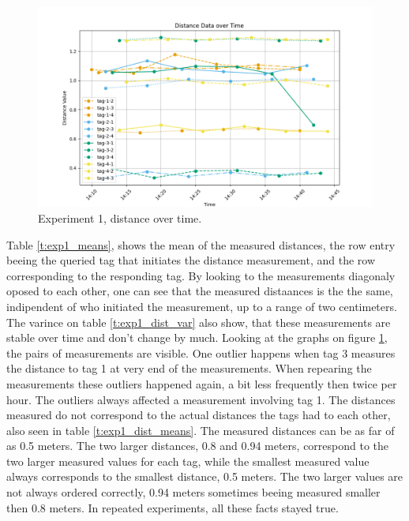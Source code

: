 \begin{figure}[ht!]
\includegraphics[width=\linewidth]{graphics/exp/exp1_dist_data_plot_0.png}
 \caption{Experiment 1, distance over time.}
\label{f:exp1_graphs_dist}
\end{figure}

Table \ref{t:exp1_means}, shows the mean of the measured distances, the row entry beeing the queried tag that initiates the distance measurement, and the row corresponding to the responding tag.
By looking to the measurements diagonaly oposed to each other, one can see that the measured distaances is the the same, indipendent of who initiated the measurement, up to a range of two centimeters.
The varince on table \ref{t:exp1_dist_var} also show, that these measurements are stable over time and don't change by much.
Looking at the graphs on figure \ref{f:exp1_graphs_dist}, the pairs of measurements are visible.
One outlier happens when tag 3 measures the distance to tag 1 at very end of the measurements.
When repearing the measurements these outliers happened again, a bit less frequently then twice per hour.
The outliers always affected a measurement involving tag 1.
The distances measured do not correspond to the actual distances the tags had to each other, also seen in table \ref{t:exp1_dist_means}.
The measured distances can be as far of as 0.5 meters.
The two larger distances, 0.8 and 0.94 meters, correspond to the two larger measured values for each tag, while the smallest measured value always corresponds to the smallest distance, 0.5 meters.
The two larger values are not always ordered correctly, 0.94 meters sometimes beeing measured smaller then 0.8 meters.
In repeated experiments, all these facts stayed true.

